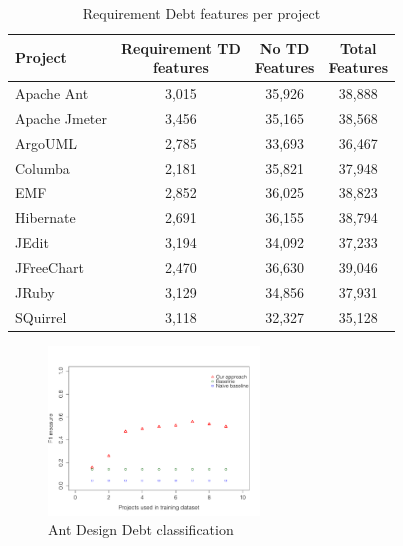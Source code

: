 \begin{table}[!hbt]
    \begin{center}
        \caption{Requirement Debt features per project}
        \label{tbl:requirement_features_per_project}
        \begin{tabular}{l| c c c }
        \toprule
        \textbf{Project} & \thead{Requirement TD\\features} & \thead{No TD\\Features} & \thead{Total\\Features} \\
        \midrule
        Apache Ant    & 3,015  & 35,926 & 38,888  \\
        Apache Jmeter & 3,456  & 35,165 & 38,568  \\
        ArgoUML       & 2,785  & 33,693 & 36,467  \\
        Columba       & 2,181  & 35,821 & 37,948  \\
        EMF           & 2,852  & 36,025 & 38,823  \\
        Hibernate     & 2,691  & 36,155 & 38,794  \\
        JEdit         & 3,194  & 34,092 & 37,233  \\
        JFreeChart    & 2,470  & 36,630 & 39,046  \\
        JRuby         & 3,129  & 34,856 & 37,931  \\
        SQuirrel      & 3,118  & 32,327 & 35,128  \\
        \bottomrule
        \end{tabular}
    \end{center}    
\end{table}

\clearpage

\begin{figure}[thb!]
  \centering
  \includegraphics[width=0.50\textwidth]{figures/design_ant.pdf}
  \vspace{-3mm}
  \caption{Ant Design Debt classification}
  \label{fig:design_ant}
\end{figure}


